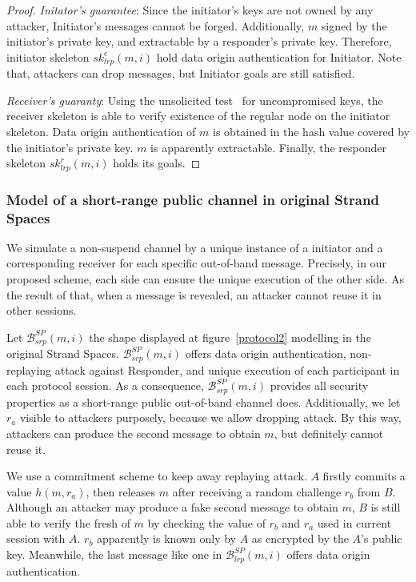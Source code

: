 \begin{proof}

\emph{Initator's guarantee}: Since the initiator’s keys are not owned by any attacker, Initiator's messages cannot be forged. Additionally, $m$ signed by the initiator's private key, and extractable by a responder's private key. Therefore, initiator skeleton $sk^e_{lrp}(m,i)$ hold data origin authentication for Initiator. Note that, attackers can drop messages, but Initiator goals are still satisfied. 

\emph{Receiver's guaranty}: Using the unsolicited test~\cite{Guttman:2002:ATS:568264.568267} for uncompromised keys, the receiver skeleton is able to verify existence of the regular node on the initiator skeleton. Data origin authentication of $m$ is obtained in the hash value covered by the initiator's private key. $m$ is apparently extractable. Finally, the responder skeleton $sk^r_{lrp}(m,i)$ holds its goals. 
 \end{proof}

\subsubsection*{Model of a short-range public channel in original Strand Spaces}\label{shortrange}

We simulate a non-suspend channel by a unique instance of a initiator and a corresponding receiver for each specific out-of-band message. Precisely, in our proposed scheme, each side can ensure the unique execution of the other side. As the result of that, when a message is revealed, an attacker cannot reuse it in other sessions. 

Let $\mathcal{B}^{SP}_{srp}(m,i)$ the shape displayed at figure~\ref{protocol2} modelling in the original Strand Spaces. $\mathcal{B}^{SP}_{srp}(m,i)$ offers data origin authentication, non-replaying attack against Responder, and unique execution of each participant in each protocol session. As a consequence, $\mathcal{B}^{SP}_{srp}(m,i)$ provides all security properties as a short-range public out-of-band channel does. Additionally, we let $r_a$ visible to attackers purposely, because we allow dropping attack. By this way, attackers can produce the second message to obtain $m$, but definitely cannot reuse it. 

We use a commitment scheme to keep away replaying attack. $A$ firstly commits a value $h(m,r_a)$, then releases $m$ after receiving a random challenge $r_b$ from $B$. Although an attacker may produce a fake second message to obtain $m$, $B$ is still able to verify the fresh of $m$ by checking the value of $r_b$ and $r_a$ used in current session with $A$. $r_b$ apparently is known only by $A$ as encrypted by the $A$'s public key. Meanwhile, the last message like one in $\mathcal{B}^{SP}_{lrp}(m,i)$ offers data origin authentication. 


